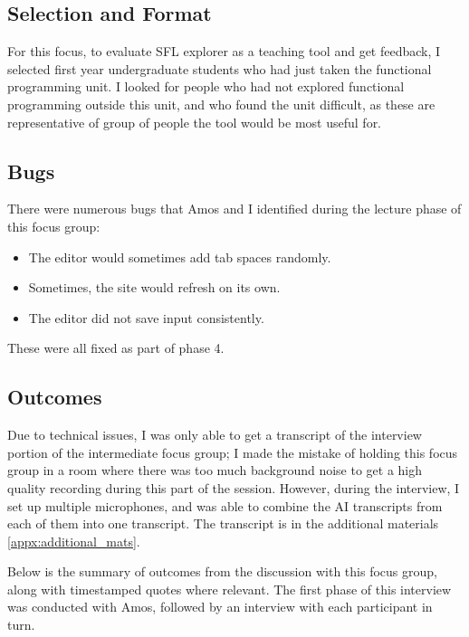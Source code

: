 \subsection{Selection and Format}
For this focus, to evaluate SFL explorer as a teaching tool and get feedback, I selected first year undergraduate students who had just taken the functional programming unit. I looked for people who had not explored functional programming outside this unit, and who found the unit difficult, as these are representative of group of people the tool would be most useful for. 

\subsection{Bugs}
There were numerous bugs that Amos and I identified during the lecture phase of this focus group:
\begin{itemize}
    \item The editor would sometimes add tab spaces randomly.
    \item Sometimes, the site would refresh on its own.
    \item The editor did not save input consistently.
\end{itemize}
\noindent These were all fixed as part of phase 4.

\subsection{Outcomes}
Due to technical issues, I was only able to get a transcript of the interview portion of the intermediate focus group; I made the mistake of holding this focus group in a room where there was too much background noise to get a high quality recording during this part of the session. However, during the interview, I set up multiple microphones, and was able to combine the AI transcripts from each of them into one transcript. The transcript is in the additional materials \ref{appx:additional_mats}. 

Below is the summary of outcomes from the discussion with this focus group, along with timestamped quotes where relevant. The first phase of this interview was conducted with Amos, followed by an interview with each participant in turn. 

